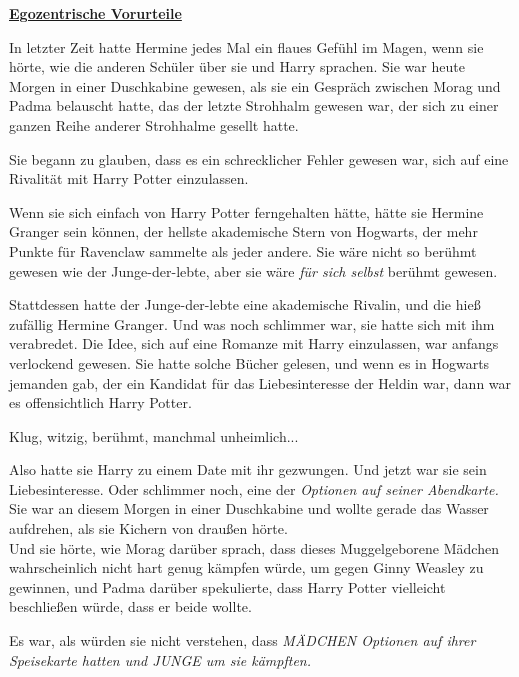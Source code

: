 

\hypertarget{egozentrische-vorurteile}{%

\textbf{\uline{Egozentrische Vorurteile}}

\hfill\break In letzter Zeit hatte Hermine jedes Mal ein flaues Gefühl im Magen, wenn sie hörte, wie die anderen Schüler über sie und Harry sprachen. Sie war heute Morgen in einer Duschkabine gewesen, als sie ein Gespräch zwischen Morag und Padma belauscht hatte, das der letzte Strohhalm gewesen war, der sich zu einer ganzen Reihe anderer Strohhalme gesellt hatte.

Sie begann zu glauben, dass es ein schrecklicher Fehler gewesen war, sich auf eine Rivalität mit Harry Potter einzulassen.

Wenn sie sich einfach von Harry Potter ferngehalten hätte, hätte sie Hermine Granger sein können, der hellste akademische Stern von Hogwarts, der mehr Punkte für Ravenclaw sammelte als jeder andere. Sie wäre nicht so berühmt gewesen wie der Junge-der-lebte, aber sie wäre \emph{für sich selbst} berühmt gewesen.

Stattdessen hatte der Junge-der-lebte eine akademische Rivalin, und die hieß zufällig Hermine Granger. Und was noch schlimmer war, sie hatte sich mit ihm verabredet. Die Idee, sich auf eine Romanze mit Harry einzulassen, war anfangs verlockend gewesen. Sie hatte solche Bücher gelesen, und wenn es in Hogwarts jemanden gab, der ein Kandidat für das Liebesinteresse der Heldin war, dann war es offensichtlich Harry Potter.

Klug, witzig, berühmt, manchmal unheimlich...

Also hatte sie Harry zu einem Date mit ihr gezwungen. Und jetzt war sie sein Liebesinteresse. Oder schlimmer noch, eine der \emph{Optionen auf seiner Abendkarte.}\\ Sie war an diesem Morgen in einer Duschkabine und wollte gerade das Wasser aufdrehen, als sie Kichern von draußen hörte.\\ Und sie hörte, wie Morag darüber sprach, dass dieses Muggelgeborene Mädchen wahrscheinlich nicht hart genug kämpfen würde, um gegen Ginny Weasley zu gewinnen, und Padma darüber spekulierte, dass Harry Potter vielleicht beschließen würde, dass er beide wollte.

Es war, als würden sie nicht verstehen, dass \emph{MÄDCHEN Optionen auf ihrer Speisekarte hatten und JUNGE um sie kämpften.}

}
